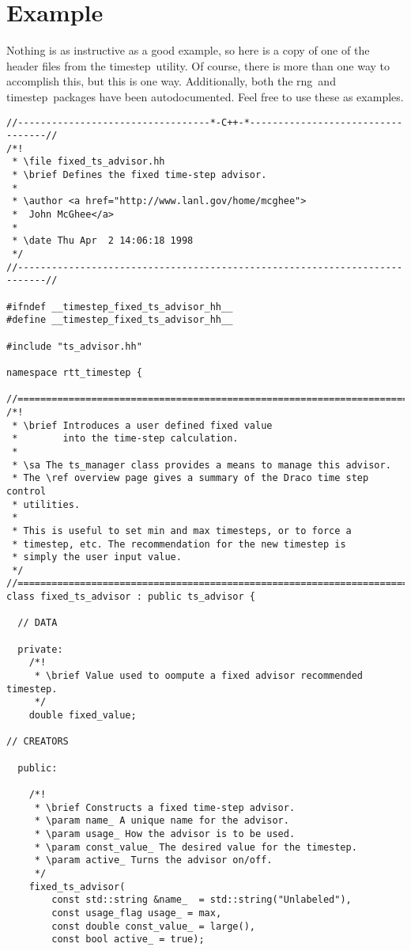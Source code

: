 \documentclass[11pt]{nmemo}
\newcommand{\rng}{{\normalfont\sffamily rng}}
\newcommand{\timestep}{{\normalfont\sffamily timestep}}
\begin{document}

\section{Example}

Nothing is as instructive as a good example, so here is a copy of
one of the header files from the \timestep\ utility. Of course,
there is more than one way to accomplish this, but this is one way.
Additionally, both the \rng\ and \timestep\ packages have been
autodocumented.  Feel free to use these as examples. 

\begin{verbatim}
//----------------------------------*-C++-*----------------------------------//
/*! 
 * \file fixed_ts_advisor.hh
 * \brief Defines the fixed time-step advisor.
 *
 * \author <a href="http://www.lanl.gov/home/mcghee">
 *  John McGhee</a>
 *
 * \date Thu Apr  2 14:06:18 1998
 */
//---------------------------------------------------------------------------//

#ifndef __timestep_fixed_ts_advisor_hh__
#define __timestep_fixed_ts_advisor_hh__

#include "ts_advisor.hh"

namespace rtt_timestep {

//===========================================================================//
/*!
 * \brief Introduces a user defined fixed value 
 *        into the time-step calculation.
 *
 * \sa The ts_manager class provides a means to manage this advisor.
 * The \ref overview page gives a summary of the Draco time step control
 * utilities. 
 *
 * This is useful to set min and max timesteps, or to force a
 * timestep, etc. The recommendation for the new timestep is
 * simply the user input value. 
 */ 
//===========================================================================//
class fixed_ts_advisor : public ts_advisor {

  // DATA

  private:
    /*!
     * \brief Value used to oompute a fixed advisor recommended timestep.
     */
    double fixed_value; 
   
// CREATORS

  public:

    /*!
     * \brief Constructs a fixed time-step advisor.
     * \param name_ A unique name for the advisor.
     * \param usage_ How the advisor is to be used.
     * \param const_value_ The desired value for the timestep.
     * \param active_ Turns the advisor on/off.
     */
    fixed_ts_advisor( 
        const std::string &name_  = std::string("Unlabeled"),
        const usage_flag usage_ = max, 
        const double const_value_ = large(),
        const bool active_ = true);


\end{verbatim}
\end{document}
